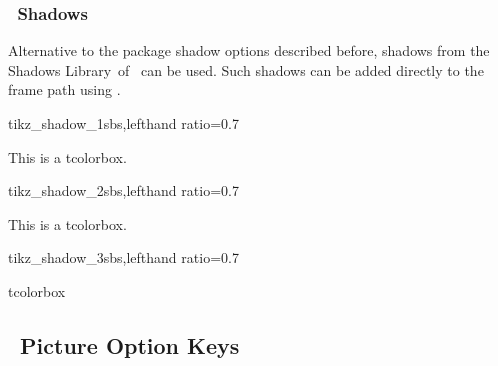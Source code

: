 \clearpage
\subsubsection{\tikzname\ Shadows}
Alternative to the package shadow options described before, shadows from
the \flqq Shadows Library\frqq\ of \tikzname\ can be used.
Such shadows can be added directly to the frame path using .

\begin{exdispExample*}{tikz_shadow_1}{sbs,lefthand ratio=0.7}
\begin{tcolorbox}[enhanced,
  colback=red!5!white,colframe=red!75!black,
  frame style={drop shadow} ]
  This is a tcolorbox.
\end{tcolorbox}
\end{exdispExample*}

\begin{exdispExample*}{tikz_shadow_2}{sbs,lefthand ratio=0.7}
\begin{tcolorbox}[enhanced,height=3cm,
  colback=red!5!white,colframe=red!75!black,
  halign=center,valign=center,
  frame style={circular drop shadow} ]
  This is a tcolorbox.
\end{tcolorbox}
\end{exdispExample*}

\begin{exdispExample*}{tikz_shadow_3}{sbs,lefthand ratio=0.7}
\begin{tcolorbox}[enhanced,width=2.5cm,
  square,circular arc,
  halign=center,valign=center,
  colback=red!5!white,colframe=red!75!black,
  frame style={circular glow={fill=red}} ]
  tcolorbox
\end{tcolorbox}
\end{exdispExample*}


\clearpage
\subsection{\tikzname\  Picture Option Keys}\label{subsec:tikzpicture}

